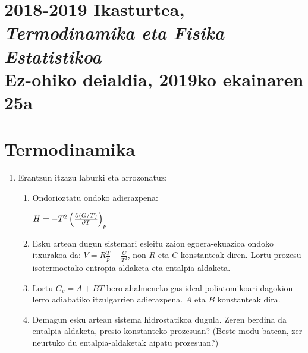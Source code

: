 \documentclass[10pt]{article}              %
\begin{document}




\section*{2018-2019 Ikasturtea, 
\textit{Termodinamika eta Fisika Estatistikoa}\\
Ez-ohiko deialdia, 
2019ko ekainaren 25a}

\section*{Termodinamika}

\begin{enumerate}

\item Erantzun itzazu laburki eta arrozonatuz:

\begin{enumerate}
\item Ondorioztatu ondoko adierazpena:

$H =  - T^2 \left( {\frac{{\partial \left( {{G \mathord{\left/
 {\vphantom {G T}} \right.
 \kern-\nulldelimiterspace} T}} \right)}}{{\partial T}}} \right)_p$

\item Esku artean dugun sistemari esleitu zaion egoera-ekuazioa ondoko itxurakoa da: $V = R\frac{T}{p} - \frac{C}{{T^2 }}$, non $R$ eta $C$ konstanteak diren. Lortu prozesu isotermoetako entropia-aldaketa eta entalpia-aldaketa.
\item Lortu $C_v  = A + BT$ bero-ahalmeneko gas ideal poliatomikoari dagokion lerro adiabatiko itzulgarrien adierazpena. $A$ eta $B$ konstanteak dira.
\item Demagun esku artean sistema hidrostatikoa dugula. Zeren berdina da entalpia-aldaketa, presio konstanteko prozesuan? (Beste modu batean, zer neurtuko du entalpia-aldaketak aipatu prozesuan?)
%
% 
\end{enumerate}


\end{enumerate}
\end{document}
